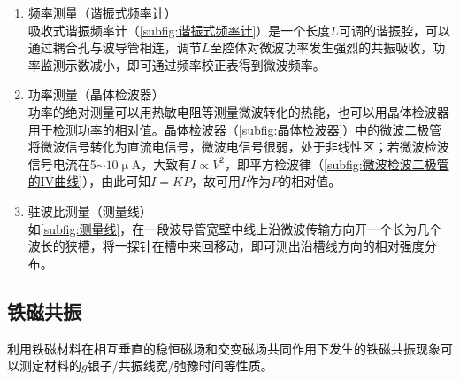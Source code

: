 		\begin{enumerate}
			\item 频率测量（谐振式频率计）\\
				吸收式谐振频率计（\cref{subfig:谐振式频率计}）是一个长度$L$可调的谐振腔，可以通过耦合孔与波导管相连，调节$L$至腔体对微波功率发生强烈的共振吸收，功率监测示数减小，即可通过频率校正表得到微波频率。
			\item 功率测量（晶体检波器）\\
				功率的绝对测量可以用热敏电阻等测量微波转化的热能，也可以用晶体检波器用于检测功率的相对值。晶体检波器（\cref{subfig:晶体检波器}）中的微波二极管将微波信号转化为直流电信号，微波电信号很弱，处于非线性区；若微波检波信号电流在5$\sim 10\upmu$A，大致有$I\propto V^2$，即平方检波律（\cref{subfig:微波检波二极管的IV曲线}），由此可知$I=KP$，故可用$I$作为$P$的相对值。
			\item 驻波比测量（测量线）\\
				如\cref{subfig:测量线}，在一段波导管宽壁中线上沿微波传输方向开一个长为几个波长的狭槽，将一探针在槽中来回移动，即可测出沿槽线方向的相对强度分布。
		\end{enumerate}
\subsection{铁磁共振} %
	\label{sub:铁磁共振}
	利用铁磁材料在相互垂直的稳恒磁场和交变磁场共同作用下发生的铁磁共振现象可以测定材料的$g$银子/共振线宽/弛豫时间等性质。
